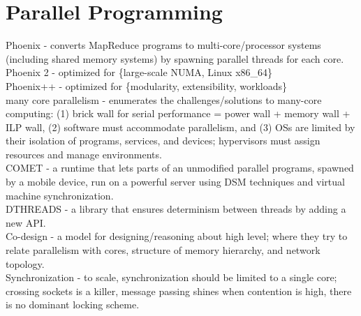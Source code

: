 \documentclass{article}
\begin{document}
\section{Parallel Programming}

\noindent\cite{ranger:2007hpca-phoenix} Phoenix - converts MapReduce programs to multi-core/processor systems (including shared memory systems) by spawning parallel threads for each core.\\

\noindent\cite{yoo:2009iiswc-phoenix2} Phoenix 2 - optimized for \{large-scale NUMA, Linux x86\_64\}\\

\noindent\cite{talbot:2011mapreduce-phoenix++} Phoenix++ - optimized for \{modularity, extensibility, workloads\}\\

\noindent\cite{manferdelli:ieee2008-parallelism} many core parallelism - enumerates the challenges/solutions to many-core computing: (1) brick wall for serial performance = power wall + memory wall + ILP wall, (2) software must accommodate parallelism, and (3) OSs are limited by their isolation of programs, services, and devices; hypervisors must assign resources and manage environments.\\

\noindent\cite{gordon:osdi2012-comet} COMET - a runtime that lets parts of an unmodified parallel programs, spawned by a mobile device, run on a powerful server using DSM techniques and virtual machine synchronization. \\

\noindent\cite{liu:sosp2011-dthreads} DTHREADS - a library that ensures determinism between threads by adding a new API.\\

\noindent\cite{czechowski:ipdps2013-codesign} Co-design - a model for designing/reasoning about high level; where they try to relate parallelism with cores, structure of memory hierarchy, and network topology.\\

\noindent\cite{david:sosp2013-synch} Synchronization - to scale, synchronization should be limited to a single core; crossing sockets is a killer, message passing shines when contention is high, there is no dominant locking scheme. 
\end{document}
